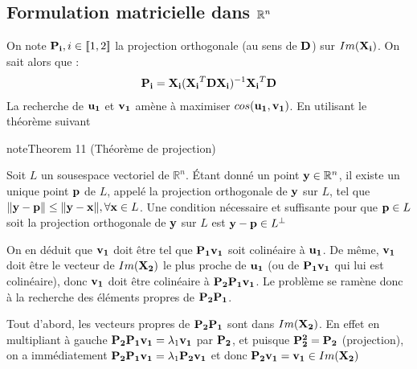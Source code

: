 \documentclass[letterpaper,10pt,french]{sphinxmanual}
\begin{document}
\subsection{Formulation matricielle dans \protect\(\mathbb{R}^n\protect\)}
\label{\detokenize{canonique:formulation-matricielle-dans-mathbb-r-n}}
\sphinxAtStartPar
On note \({\bf {\bf {\bf P_i}}},i\in[\![1,2]\!]\) la projection orthogonale (au sens de \({\bf D}\)) sur \(Im({\bf {\bf {\bf X_i}}})\). On sait alors que :
\begin{equation*}
\begin{split}{\bf {\bf P_i}}={\bf {\bf X_i}}({\bf {\bf X_i}}^T{\bf D}{\bf {\bf X_i}})^{-1}{\bf {\bf X_i}}^T{\bf D}\end{split}
\end{equation*}
\sphinxAtStartPar
La recherche de  \({\bf {\bf u_1}}\) et \({\bf v_1}\) amène à maximiser \(cos({\bf {\bf u_1}},{\bf v_1})\). En utilisant le théorème suivant
\label{canonique:theorem-0}
\begin{sphinxadmonition}{note}{Theorem 11 (Théorème de projection)}



\sphinxAtStartPar
Soit \(L\) un sous\sphinxhyphen{}espace vectoriel de \(\mathbb{R}^n\). Étant donné un point \({\bf y}\in \mathbb{R}^n\), il existe un unique point \({\bf p}\) de \(L\), appelé la projection orthogonale de \({\bf y}\) sur \(L\), tel que \(\|{\bf y}-{\bf p}\|\leq \|{\bf y}-{\bf x}\|,\forall {\bf x}\in L\). Une condition nécessaire et suffisante pour que \({\bf p}\in L\) soit la projection orthogonale de \({\bf y}\) sur \(L\) est \({\bf y}-{\bf p}\in L^\bot\)
\end{sphinxadmonition}

\sphinxAtStartPar
On en déduit que \({\bf v_1}\) doit être tel que \({\bf P_1}{\bf v_1}\) soit colinéaire à \({\bf {\bf u_1}}\). De même, \({\bf v_1}\) doit être le vecteur de \(Im({\bf {\bf X_2}})\) le plus proche de \({\bf {\bf u_1}}\) (ou de \({\bf P_1}{\bf v_1}\) qui lui est colinéaire), donc \({\bf v_1}\) doit être colinéaire à \({\bf P_2}{\bf P_1}{\bf v_1}\). Le problème se ramène donc à la recherche des éléments propres de \({\bf P_2}{\bf P_1}\).

\sphinxAtStartPar
Tout d’abord, les vecteurs propres de \({\bf P_2}{\bf P_1}\) sont dans \(Im({\bf {\bf X_2}})\). En effet en multipliant à gauche \({\bf P_2}{\bf P_1}{\bf v_1}=\lambda_1{\bf v_1}\) par \({\bf P_2}\), et puisque \({\bf P_2^2}={\bf P_2}\) (projection), on a immédiatement \({\bf P_2}{\bf P_1}{\bf v_1}=\lambda_1{\bf P_2}{\bf v_1}\) et donc \({\bf P_2}{\bf v_1}={\bf v_1}\in Im({\bf {\bf X_2}})\)
\end{document}
